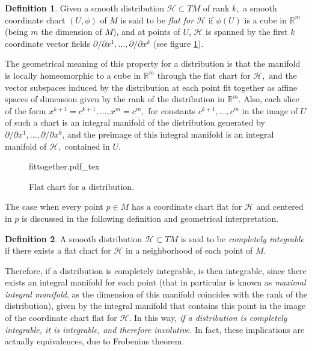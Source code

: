 \documentclass[12pt, letterpaper, reqno]{amsart}
\newcommand{\incfig}[2][1]{%
    \def\svgwidth{#1\columnwidth}
    {#2.pdf_tex}
}
\theoremstyle{definition}
\newtheorem{df}{Definition}
\theoremstyle{plain}
\theoremstyle{remark}
\begin{document}
\begin{df}
	Given a smooth distribution $ \mathcal{H}\subset TM $  of rank $ k, $ a smooth coordinate chart $ (U,\phi) $ of $ M $ is said to be \textit{flat for $ \mathcal{H} $ } if $ \phi(U) $ is a cube in $ \mathbb{R}^m  $ (being $ m $ the dimension of $ M $), and at points of $ U $, $ \mathcal{H} $ is spanned by the first $ k $ coordinate vector fields $ \partial/\partial x^1,\dots,\partial/\partial x^k $ (see figure \ref{fig:fittogether}).
\end{df}
The geometrical meaning of this property for a distribution is that the manifold is locally homeomorphic to a cube in $ \mathbb{R}^m  $ through the flat chart for $ \mathcal{H}, $  and the vector subspaces induced by the distribution at each point fit together as affine spaces of dimension given by the rank of the distribution in $ \mathbb{R}^m $. Also, each slice of the form $ x^{k+1}=c^{k+1},\dots, x^m=c^m,$ for constants $ c^{k+1}, \dots, c^m $ in the image of $ U $ of such a chart is an integral manifold of the distribution generated by $ \partial/\partial x^1,\dots,\partial/\partial x^k $, and the preimage of this integral manifold is an integral manifold of $ \mathcal{H}, $ contained in $ U. $  

\begin{figure}
    \centering
    \incfig{fittogether}
    \caption{Flat chart for a distribution.}
    \label{fig:fittogether}
\end{figure}

The case when every point $p\in M $ has a coordinate chart flat for $ \mathcal{H} $ and centered in $ p $ is discussed in the following definition and geometrical interpretation.

\begin{df}
	A smooth distribution $ \mathcal{H}\subset TM $  is said to be \textit{completely integrable} if there exists a flat chart for $ \mathcal{H} $ in a neighborhood of each point of $ M. $ 
\end{df}

Therefore, if a distribution is completely integrable, is then integrable, since there exists an integral manifold for each point (that in particular is known as \textit{maximal integral manifold}, as the dimension of this manifold coincides with the rank of the distribution), given by the integral manifold that contains this point in the image of the coordinate chart flat for $ \mathcal{H}. $ In this way, \textit{ if a distribution is completely integrable, it is integrable, and therefore involutive.} In fact, these implications are actually equivalences, due to Frobenius theorem.
\end{document}
